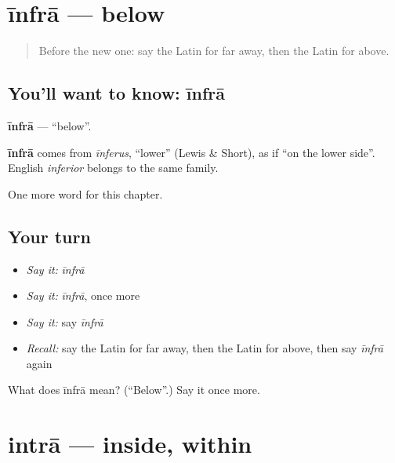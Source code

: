 \section[īnfrā]{īnfrā — below}

\label{lesson:LA-C102-infra}



\begin{quote}
Before the new one: say the Latin for far away, then the Latin for above.
\end{quote}

\subsection*{You'll want to know: īnfrā}
\textbf{īnfrā} — \textquotedblleft{}below\textquotedblright{}.

\begin{cousinweb}
\textbf{īnfrā} comes from \emph{īnferus}, \textquotedblleft{}lower\textquotedblright{} (Lewis \& Short), as if \textquotedblleft{}on the lower side\textquotedblright{}. English \emph{inferior} belongs to the same family.
\end{cousinweb}

\begin{grammarlens}[title={What you've built}]
One more word for this chapter.
\end{grammarlens}

\subsection*{Your turn}
\begin{itemize}
\raggedright
  \item \emph{Say it:} \emph{īnfrā}
  \item \emph{Say it:} \emph{īnfrā}, once more
  \item \emph{Say it:} say \emph{īnfrā}
  \item \emph{Recall:} say the Latin for far away, then the Latin for above, then say \emph{īnfrā} again
\end{itemize}

\begin{tcolorbox}[breakable,colback=teal!4,colframe=teal!35!black,title={Before you move on}]
What does īnfrā mean? (\textquotedblleft{}Below\textquotedblright{}.) Say it once more.
\end{tcolorbox}
\section[intrā]{intrā — inside, within}

